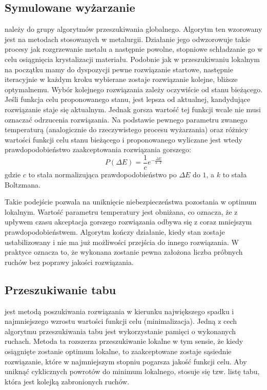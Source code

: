 \subsection{Symulowane wyżarzanie}

 należy do grupy algorytmów przeszukiwania globalnego. Algorytm ten wzorowany jest na metodach stosowanych w metalurgii. 
Działanie jego odwzorowuje takie procesy jak rozgrzewanie metalu a następnie powolne, stopniowe schładzanie go w celu osiągnięcia krystalizacji materiału.
Podobnie jak w przeszukiwaniu lokalnym na początku mamy do dyspozycji pewne rozwiązanie startowe, następnie iteracyjnie w każdym kroku 
wybierane zostaje rozwiązanie kolejne, bliższe optymalnemu. Wybór kolejnego rozwiązania zależy oczywiście od stanu bieżącego. Jeśli funkcja celu 
proponowanego stanu, jest lepsza od aktualnej, kandydujące rozwiązanie staje się aktualnym. Jednak gorsza wartość tej funkcji wcale nie musi 
oznaczać odrzucenia rozwiązania. Na podstawie pewnego parametru zwanego temperaturą (analogicznie do rzeczywistego procesu wyżarzania) oraz 
różnicy wartości funkcji celu stanu bieżącego i proponowanego wyliczane jest wtedy prawdopodobieństwo zaakceptowania rozwiązania gorszego:
\begin{displaymath}
P(\Delta{E}) = \frac{1}{c} e^{-\frac{\Delta{E}}{k \cdot T}}
\end{displaymath}
gdzie $c$ to stała normalizująca prawdopodobieństwo po $\Delta{E}$ do $1$, a $k$ to stała Boltzmana.

Takie podejście pozwala na uniknięcie niebezpieczeństwa pozostania w optimum lokalnym. Wartość parametru temperatury jest obniżana, co oznacza, 
że z upływem czasu akceptacja gorszego rozwiązania odbywa się z coraz mniejszym prawdopodobieństwem. Algorytm kończy działanie, kiedy stan 
zostaje ustabilizowany i nie ma już możliwości przejścia do innego rozwiązania. W praktyce oznacza to, że wykonana zostanie pewna założona 
liczba próbnych ruchów bez poprawy jakości rozwiązania.

\subsection{Przeszukiwanie tabu}

 jest metodą poszukiwania rozwiązania w kierunku największego spadku i najmniejszego wzrostu wartości funkcji celu (minimalizacja). 
Jedną z cech algorytmu przeszukiwania tabu jest wykorzystanie pamięci o wykonanych ruchach. Metoda ta rozszerza przeszukiwanie lokalne w tym sensie, 
że kiedy osiągnięte zostanie optimum lokalne, to zaakceptowane zostaje sąsiednie rozwiązanie, które w najmniejszym stopniu pogarsza jakość 
funkcji celu. Aby uniknąć cyklicznych powrotów do minimum lokalnego, stosuje się tzw. listę tabu, która jest kolejką zabronionych ruchów.

